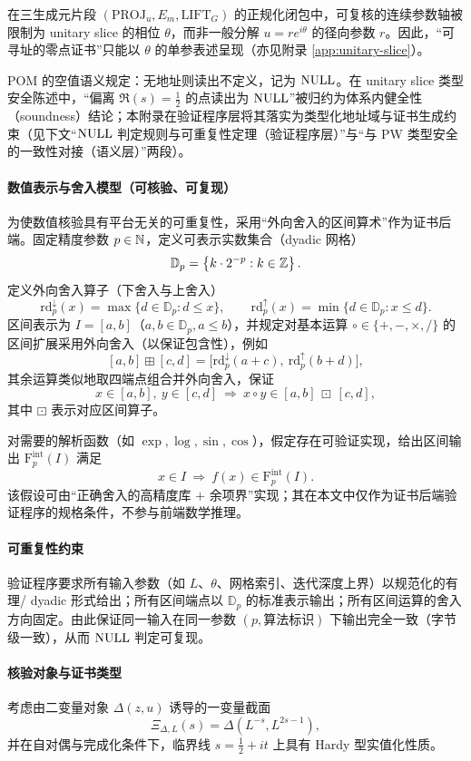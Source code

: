 在三生成元片段 $(\mathrm{PROJ}_u,E_m,\mathrm{LIFT}_G)$ 的正规化闭包中，可复核的连续参数轴被限制为 unitary slice 的相位 $\theta$，而非一般分解 $u=re^{i\theta}$ 的径向参数 $r$。因此，“可寻址的零点证书”只能以 $\theta$ 的单参表述呈现（亦见附录 \ref{app:unitary-slice}）。

POM 的空值语义规定：无地址则读出不定义，记为 $\mathrm{NULL}$。在 unitary slice 类型安全陈述中，“偏离 $\Re(s)=\frac12$ 的点读出为 $\mathrm{NULL}$”被归约为体系内健全性（soundness）结论；本附录在验证程序层将其落实为类型化地址域与证书生成约束（见下文“$\mathrm{NULL}$ 判定规则与可重复性定理（验证程序层）”与“与 PW 类型安全的一致性对接（语义层）”两段）。

\paragraph{数值表示与舍入模型（可核验、可复现）}
为使数值核验具有平台无关的可重复性，采用“外向舍入的区间算术”作为证书后端。固定精度参数 $p\in\mathbb{N}$，定义可表示实数集合（dyadic 网格）
$$
\mathbb D_p=\left\{k\cdot 2^{-p}:k\in\mathbb{Z}\right\}.
$$
定义外向舍入算子（下舍入与上舍入）
$$
\mathrm{rd}_p^{\downarrow}(x)=\max\{d\in\mathbb D_p:d\le x\},\qquad
\mathrm{rd}_p^{\uparrow}(x)=\min\{d\in\mathbb D_p:x\le d\}.
$$
区间表示为 $I=[a,b]$（$a,b\in\mathbb D_p, a\le b$），并规定对基本运算 $\circ\in\{+,-,\times,/\}$ 的区间扩展采用外向舍入（以保证包含性），例如
$$
[a,b]\boxplus[c,d]=\bigl[\mathrm{rd}_p^{\downarrow}(a+c),\ \mathrm{rd}_p^{\uparrow}(b+d)\bigr],
$$
其余运算类似地取四端点组合并外向舍入，保证
$$
x\in[a,b],\ y\in[c,d]\ \Longrightarrow\ x\circ y\in [a,b]\ \boxdot\ [c,d],
$$
其中 $\boxdot$ 表示对应区间算子。

对需要的解析函数（如 $\exp,\log,\sin,\cos$），假定存在可验证实现，给出区间输出 $\mathrm{F}_p^{\mathrm{int}}(I)$ 满足
$$
x\in I\ \Longrightarrow\ f(x)\in \mathrm{F}_p^{\mathrm{int}}(I).
$$
该假设可由“正确舍入的高精度库 $+$ 余项界”实现；其在本文中仅作为证书后端验证程序的规格条件，不参与前端数学推理。

\paragraph{可重复性约束}
验证程序要求所有输入参数（如 $L$、$\theta$、网格索引、迭代深度上界）以规范化的有理/ dyadic 形式给出；所有区间端点以 $\mathbb D_p$ 的标准表示输出；所有区间运算的舍入方向固定。由此保证同一输入在同一参数 $(p,\text{算法标识})$ 下输出完全一致（字节级一致），从而 $\mathrm{NULL}$ 判定可复现。

\paragraph{核验对象与证书类型}
考虑由二变量对象 $\Delta(z,u)$ 诱导的一变量截面
$$
\Xi_{\Delta,L}(s)=\Delta(L^{-s},L^{2s-1}),
$$
并在自对偶与完成化条件下，临界线 $s=\frac12+it$ 上具有 Hardy 型实值化性质。

